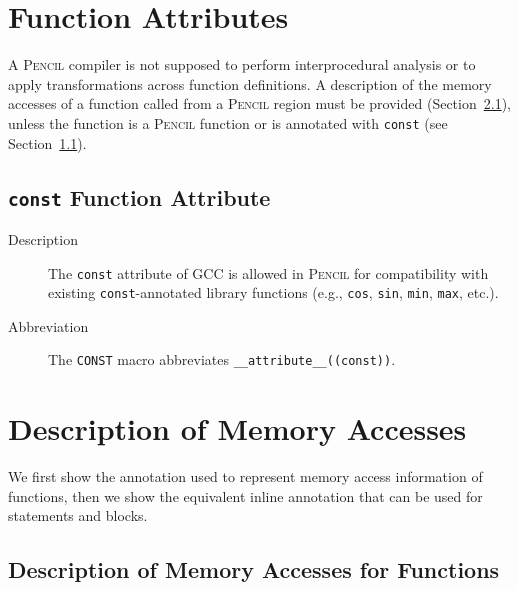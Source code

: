 \documentclass{carp}
\newcommand\pencil{\textsc{Pencil}\xspace}
\begin{document}
\section{Function Attributes}

A \pencil compiler is not supposed to perform interprocedural analysis or to
apply transformations across function definitions.
A description of the memory accesses of a function called from a \pencil
region must be provided (Section~\ref{sec:mem-acces-info-for-functions}),
unless the function is a \pencil function
or is annotated with \lstinline!const! (see Section~\ref{sec:const-attribute}).

\subsection{\lstinline!const! Function Attribute}
\label{sec:const-attribute}

\begin{description}
\item[Description] The \lstinline!const! attribute of GCC is allowed in
  \pencil for compatibility with existing \lstinline!const!-annotated
  library functions (e.g., \lstinline!cos!, \lstinline!sin!, \lstinline!min!,
  \lstinline!max!, etc.).

\item[Abbreviation] The \lstinline!CONST! macro abbreviates
  \lstinline!__attribute__((const))!.
\end{description}
  
\section{Description of Memory Accesses}
\label{sec:mem-acces-info}
We first show the annotation used to represent memory access information
of functions, then we show the equivalent inline annotation that can be used
for statements and blocks.

\subsection{Description of Memory Accesses for Functions}
\label{sec:mem-acces-info-for-functions}

\end{document}
